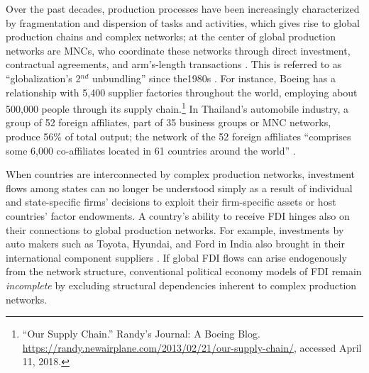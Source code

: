 \documentclass[reqno,onecolumn,letterpaper,12pt]{article}
\begin{document}
Over the past decades, production processes have been increasingly characterized by fragmentation and dispersion of tasks and activities, which gives rise to global production chains and complex networks; at the center of global production networks are MNCs, who coordinate these networks through direct investment, contractual agreements, and arm's-length transactions \citep{UNCTAD:2013}.  This is referred to as ``globalization's 2$^{nd}$ unbundling'' since the1980s \citep{Baldwin:2011}. %
For instance, Boeing has a relationship with 5,400 supplier factories throughout the world, employing about 500,000 people through its supply chain.\footnote{``Our Supply Chain.'' Randy's Journal: A Boeing Blog. \url{https://randy.newairplane.com/2013/02/21/our-supply-chain/}, accessed April 11, 2018.} In Thailand's automobile industry, a group of 52 foreign affiliates, part of 35 business groups or MNC networks, produce 56\% of total output; the network of the 52 foreign affiliates ``comprises some 6,000 co-affiliates located in 61 countries around the world'' \citep[137]{UNCTAD:2013}. 

When countries are interconnected by complex production networks, investment flows among states can no longer be understood simply as a result of individual and state-specific firms' decisions to exploit their firm-specific assets or host countries' factor endowments. A country's ability to receive FDI hinges also on their connections to global production networks. For example, investments by auto makers such as Toyota, Hyundai, and Ford in India also brought in their international component suppliers \citep[23]{Moran:2014}. If global FDI flows can arise endogenously from the network structure, conventional political economy models of FDI remain \textit{incomplete} by excluding structural dependencies inherent to complex production networks.

\end{document}
